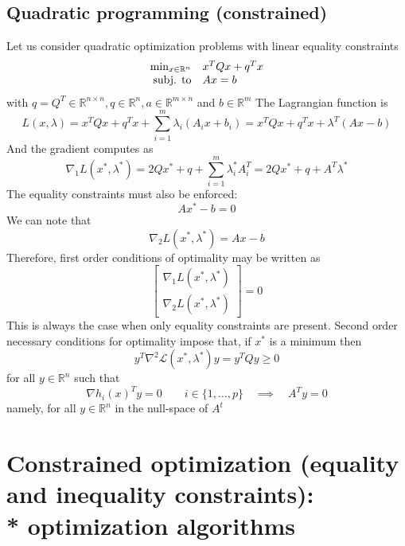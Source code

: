\documentclass{book}
\newcommand{\R}{\mathbb{R}}
\theoremstyle{definition}
\theoremstyle{remark}
\theoremstyle{remark}
\begin{document}
\subsection{Quadratic programming (constrained)}
Let us consider quadratic optimization problems with linear equality constraints 
\[
    \begin{array}{r l}
        \min_{x\in\R^n}& x^TQx+q^Tx \\
        \text{subj. to}& Ax=b
    \end{array}
\]
with $q=Q^T\in\R^{n\times n}, q\in\R^n, a\in\R^{m\times n}$ and $b\in\R^m$
The Lagrangian function is 
\[
    L(x,\lambda) = x^TQx + q^Tx +\displaystyle\sum_{i=1}^{m}\lambda_i(A_ix+b_i) =  x^TQx + q^Tx + \lambda^T(Ax-b)
\]
And the gradient computes as 
\[
    \nabla_1 L(x^*,\lambda^*) = 2Qx^* + q + \displaystyle\sum_{i=1}^{m}\lambda_i^*A_i^T =  2Qx^* + q + A^T\lambda^*
\]
The equality constraints must also be enforced: 
\[
    Ax^*-b = 0
\]
We can note that 
\[
    \nabla_2L(x^*,\lambda^*) = Ax-b
\]
Therefore, first order conditions of optimality may be written as 
\[
    \begin{bmatrix}
        \nabla_1L(x^*,\lambda^*)\\ \nabla_2L(x^*,\lambda^*)
    \end{bmatrix} = 0
\]
This is always the case when only equality constraints are present. Second order necessary conditions for optimality impose that, if $x^*$ is a minimum then 
\[
    y^T\nabla^2\mathcal{L}(x^*,\lambda^*)y = y^TQy \geq 0
\]
for all $y\in\R^n$ such that 
\[
    \nabla h_i(x)^T y = 0 \qquad i\in\{1,\dots,p\} \quad \implies \quad A^Ty = 0
\]
namely, for all $y\in\R^n$ in the null-space of $A^t$
\section[Constrained optimization (equality and inequality constraints): optimization algorithms]{Constrained optimization (equality and inequality constraints):\\* optimization algorithms}
\end{document}
